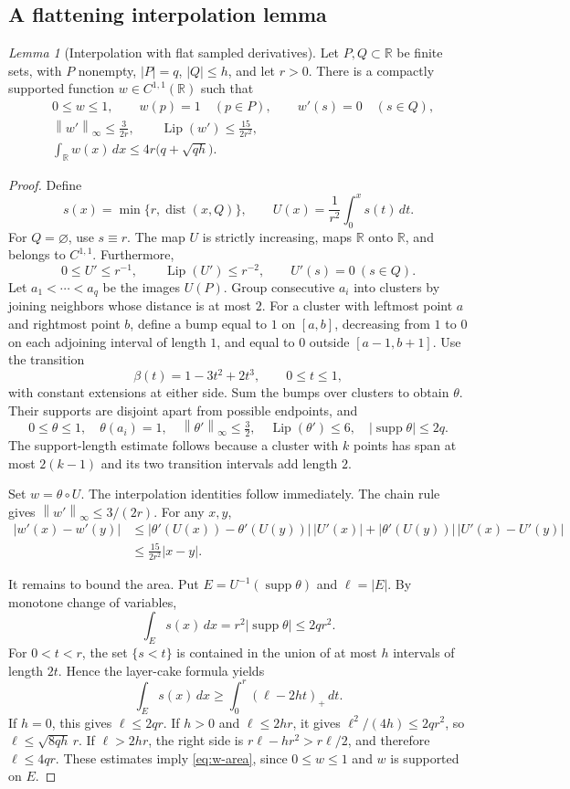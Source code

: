 \documentclass[11pt]{article}
\newtheorem{lemma}[theorem]{Lemma}
\theoremstyle{remark}
\newtheorem{lemma}[lemma]{Lemma}
\theoremstyle{remark}
\newcommand{\R}{\mathbb R}
\newcommand{\norm}[1]{\left\lVert#1\right\rVert}
\newcommand{\Lip}{\operatorname{Lip}}
\newcommand{\dist}{\operatorname{dist}}
\newcommand{\supp}{\operatorname{supp}}
\begin{document}
\subsection{A flattening interpolation lemma}
\begin{lemma}[Interpolation with flat sampled derivatives]\label{lem:flatten}
Let $P,Q\subset\R$ be finite sets, with $P$ nonempty, $|P|=q$, $|Q|\le h$, and let $r>0$. There is a compactly supported function $w\in C^{1,1}(\R)$ such that
\begin{align}
 &0\le w\le1,\qquad w(p)=1\quad(p\in P),\qquad w'(s)=0\quad(s\in Q),\label{eq:interp}\\
 &\norm{w'}_\infty\le\frac{3}{2r},\qquad
 \Lip(w')\le\frac{15}{2r^2},\label{eq:w-smooth}\\
 &\int_\R w(x)\,dx\le4r\bigl(q+\sqrt{qh}\bigr).\label{eq:w-area}
\end{align}
\end{lemma}
\begin{proof}
Define
\[
 s(x)=\min\{r,\dist(x,Q)\},\qquad
 U(x)=\frac1{r^2}\int_0^x s(t)\,dt.
\]
For $Q=\varnothing$, use $s\equiv r$. The map $U$ is strictly increasing, maps $\R$ onto $\R$, and belongs to $C^{1,1}$. Furthermore,
\[
 0\le U'\le r^{-1},\qquad \Lip(U')\le r^{-2},\qquad U'(s)=0\ (s\in Q).
\]
Let $a_1<\cdots<a_q$ be the images $U(P)$. Group consecutive $a_i$ into clusters by joining neighbors whose distance is at most $2$. For a cluster with leftmost point $a$ and rightmost point $b$, define a bump equal to $1$ on $[a,b]$, decreasing from $1$ to $0$ on each adjoining interval of length $1$, and equal to $0$ outside $[a-1,b+1]$. Use the transition
\[
 \beta(t)=1-3t^2+2t^3,\qquad 0\le t\le1,
\]
with constant extensions at either side. Sum the bumps over clusters to obtain $\theta$. Their supports are disjoint apart from possible endpoints, and
\[
 0\le\theta\le1,\quad \theta(a_i)=1,\quad
 \norm{\theta'}_\infty\le\tfrac32,\quad \Lip(\theta')\le6,
 \quad |\supp\theta|\le2q.
\]
The support-length estimate follows because a cluster with $k$ points has span at most $2(k-1)$ and its two transition intervals add length $2$.

Set $w=\theta\circ U$. The interpolation identities follow immediately. The chain rule gives $\norm{w'}_\infty\le3/(2r)$. For any $x,y$,
\begin{align*}
 |w'(x)-w'(y)|
 &\le |\theta'(U(x))-\theta'(U(y))|\,|U'(x)|
      +|\theta'(U(y))|\,|U'(x)-U'(y)|\\
 &\le\frac{15}{2r^2}|x-y|.
\end{align*}

It remains to bound the area. Put $E=U^{-1}(\supp\theta)$ and $\ell=|E|$. By monotone change of variables,
\[
 \int_E s(x)\,dx=r^2|\supp\theta|\le2qr^2.
\]
For $0<t<r$, the set $\{s<t\}$ is contained in the union of at most $h$ intervals of length $2t$. Hence the layer-cake formula yields
\[
 \int_E s(x)\,dx\ge\int_0^r(\ell-2ht)_+\,dt.
\]
If $h=0$, this gives $\ell\le2qr$. If $h>0$ and $\ell\le2hr$, it gives $\ell^2/(4h)\le2qr^2$, so $\ell\le\sqrt{8qh}\,r$. If $\ell>2hr$, the right side is $r\ell-hr^2>r\ell/2$, and therefore $\ell\le4qr$. These estimates imply \eqref{eq:w-area}, since $0\le w\le1$ and $w$ is supported on $E$.
\end{proof}
\end{document}
